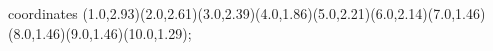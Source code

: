					coordinates { (1.0,2.93)(2.0,2.61)(3.0,2.39)(4.0,1.86)(5.0,2.21)(6.0,2.14)(7.0,1.46)(8.0,1.46)(9.0,1.46)(10.0,1.29)};